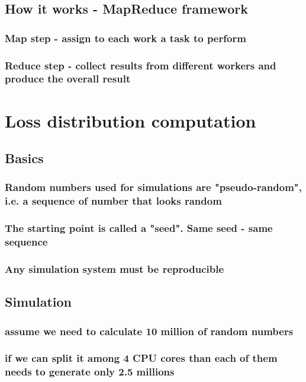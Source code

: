 \documentclass[bigger]{beamer}
\begin{document}
\subsection{How it works - MapReduce framework}
\label{sec-1-3}
\subsubsection{Map step - assign to each work a task to perform}
\label{sec-1-3-1}
\subsubsection{Reduce step - collect results from different workers and produce the overall result}
\label{sec-1-3-2}
\section{Loss distribution computation}
\label{sec-2}
\subsection{Basics}
\label{sec-2-1}
\subsubsection{Random numbers used for simulations are "pseudo-random", i.e. a sequence of number that looks random}
\label{sec-2-1-1}
\subsubsection{The starting point is called a "seed". Same seed - same sequence}
\label{sec-2-1-2}
\subsubsection{Any simulation system must be reproducible}
\label{sec-2-1-3}
\subsection{Simulation}
\label{sec-2-2}
\subsubsection{assume we need to calculate 10 million of random numbers}
\label{sec-2-2-1}
\subsubsection{if we can split it among 4 CPU cores than each of them needs to generate only 2.5 millions}
\label{sec-2-2-2}
\end{document}
